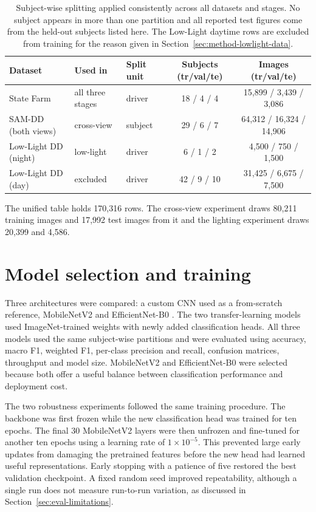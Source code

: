\begin{table}[htbp]
\centering
\caption{Subject-wise splitting applied consistently across all datasets and stages. No subject appears in more than one partition and all reported test figures come from the held-out subjects listed here. The Low-Light daytime rows are excluded from training for the reason given in Section~\ref{sec:method-lowlight-data}.}
\label{tab:split-integrity}
\footnotesize
\begin{tabular}{lllcc}
\toprule
\textbf{Dataset} & \textbf{Used in} & \textbf{Split unit} & \textbf{Subjects (tr/val/te)} & \textbf{Images (tr/val/te)} \\
\midrule
State Farm & all three stages & driver & 18 / 4 / 4 & 15{,}899 / 3{,}439 / 3{,}086 \\
SAM-DD (both views) & cross-view & subject & 29 / 6 / 7 & 64{,}312 / 16{,}324 / 14{,}906 \\
Low-Light DD (night) & low-light & driver & 6 / 1 / 2 & 4{,}500 / 750 / 1{,}500 \\
Low-Light DD (day) & excluded & driver & 42 / 9 / 10 & 31{,}425 / 6{,}675 / 7{,}500 \\
\bottomrule
\end{tabular}
\end{table}

The unified table holds 170{,}316 rows. The cross-view experiment draws 80{,}211 training images and 17{,}992 test images from it and the lighting experiment draws 20{,}399 and 4{,}586.

\section{Model selection and training}

Three architectures were compared: a custom CNN used as a from-scratch reference, MobileNetV2 \citep{sandler2018mobilenetv2} and EfficientNet-B0 \citep{tan2019efficientnet}. The two transfer-learning models used ImageNet-trained weights with newly added classification heads. All three models used the same subject-wise partitions and were evaluated using accuracy, macro F1, weighted F1, per-class precision and recall, confusion matrices, throughput and model size. MobileNetV2 and EfficientNet-B0 were selected because both offer a useful balance between classification performance and deployment cost.

The two robustness experiments followed the same training procedure. The backbone was first frozen while the new classification head was trained for ten epochs. The final 30 MobileNetV2 layers were then unfrozen and fine-tuned for another ten epochs using a learning rate of $1\times10^{-5}$. This prevented large early updates from damaging the pretrained features before the new head had learned useful representations. Early stopping with a patience of five restored the best validation checkpoint. A fixed random seed improved repeatability, although a single run does not measure run-to-run variation, as discussed in Section~\ref{sec:eval-limitations}.

